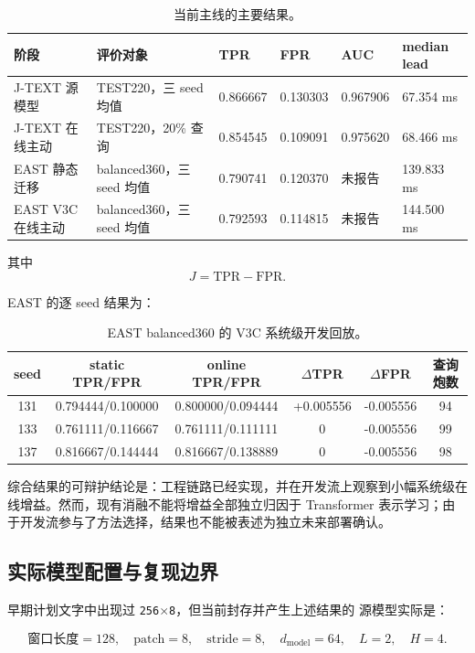\documentclass[11pt,a4paper]{article}
\newcommand{\code}[1]{\texttt{\small #1}}
\begin{document}
\begin{table}[H]
\centering
\caption{当前主线的主要结果。}
\label{tab:main-result}
\small
\begin{tabularx}{\textwidth}{p{34mm} p{34mm} C{16mm} C{16mm} C{16mm} C{22mm}}
\toprule
阶段 & 评价对象 & TPR & FPR & AUC & median lead\\
\midrule
J-TEXT 源模型 & TEST220，三 seed 均值 & 0.866667 & 0.130303 & 0.967906 & 67.354 ms\\
J-TEXT 在线主动 & TEST220，20\% 查询 & 0.854545 & 0.109091 & 0.975620 & 68.466 ms\\
EAST 静态迁移 & balanced360，三 seed 均值 & 0.790741 & 0.120370 & 未报告 & 139.833 ms\\
EAST V3C 在线主动 & balanced360，三 seed 均值 & 0.792593 & 0.114815 & 未报告 & 144.500 ms\\
\bottomrule
\end{tabularx}
\end{table}

其中
\[
J=\mathrm{TPR}-\mathrm{FPR}.
\]

EAST 的逐 seed 结果为：

\begin{table}[H]
\centering
\caption{EAST balanced360 的 V3C 系统级开发回放。}
\begin{tabular}{c c c c c c}
\toprule
seed & static TPR/FPR & online TPR/FPR & $\Delta$TPR & $\Delta$FPR & 查询炮数\\
\midrule
131 & 0.794444/0.100000 & 0.800000/0.094444 & +0.005556 & -0.005556 & 94\\
133 & 0.761111/0.116667 & 0.761111/0.111111 & 0 & -0.005556 & 99\\
137 & 0.816667/0.144444 & 0.816667/0.138889 & 0 & -0.005556 & 98\\
\bottomrule
\end{tabular}
\end{table}

综合结果的可辩护结论是：工程链路已经实现，并在开发流上观察到小幅系统级在线增益。然而，现有消融不能将增益全部独立归因于 Transformer 表示学习；由于开发流参与了方法选择，结果也不能被表述为独立未来部署确认。

\subsection{实际模型配置与复现边界}

早期计划文字中出现过 \code{256$\times$8}，但当前封存并产生上述结果的
源模型实际是：

\[
\text{窗口长度}=128,\quad
\text{patch}=8,\quad
\text{stride}=8,\quad
d_{\mathrm{model}}=64,\quad
L=2,\quad H=4.
\]
\end{document}
